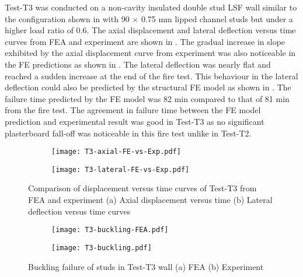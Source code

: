 Test-T3 was conducted on a non-cavity insulated double stud LSF wall similar to the configuration shown in  with 90 $\times$ 0.75 mm lipped channel studs but under a higher load ratio of 0.6. The axial displacement and lateral deflection versus time curves from FEA and experiment are shown in . The gradual increase in slope exhibited by the axial displacement curve from experiment was also noticeable in the FE predictions as shown in . The lateral deflection was nearly flat and reached a sudden increase at the end of the fire test. This behaviour in the lateral deflection could also be predicted by the structural FE model as shown in . The failure time predicted by the FE model was 82 min compared to that of 81 min from the fire test. The agreement in failure time between the FE model prediction and experimental result was good in Test-T3 as no significant plasterboard fall-off was noticeable in this fire test unlike in Test-T2.
\begin{figure}[!htbp]
	\centering
	\begin{subfigure}[b]{0.7\textwidth}
		\centering
		\texttt{[image: T3-axial-FE-vs-Exp.pdf]}
		\caption{}
		\label{subfig:T3-axial-FE-vs-Exp}
	\end{subfigure}
	\begin{subfigure}[b]{0.7\textwidth}
		\centering
		\texttt{[image: T3-lateral-FE-vs-Exp.pdf]}
		\caption{}
		\label{subfig:T3-lateral-FE-vs-Exp}
	\end{subfigure}
	   \caption{Comparison of displacement versus time curves of Test-T3 from FEA and experiment (a) Axial displacement versus time (b) Lateral deflection versus time curves}
	   \label{fig:T3-structural-FE-vs-Exp}
\end{figure} 
\begin{figure}[!htbp]
	\centering
	\begin{subfigure}[b]{0.8\textwidth}
		\centering
		\texttt{[image: T3-buckling-FEA.pdf]}
		\caption{}
		\label{subfig:T3-buckling-FEA}
	\end{subfigure}
	\begin{subfigure}[b]{0.45\textwidth}
		\centering
		\texttt{[image: T3-buckling.pdf]}
		\caption{}
		\label{subfig:T3-buckling-FEA-Exp}
	\end{subfigure}
	   \caption{Buckling failure of studs in Test-T3 wall (a) FEA (b) Experiment}
	   \label{fig:T3-buckling-FE-vs-Exp}
\end{figure} 

